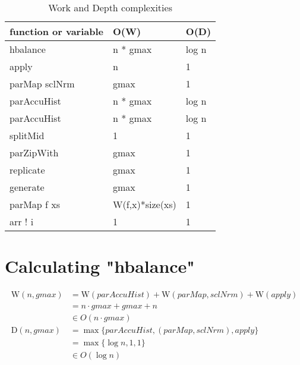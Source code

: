 \documentclass{article}
\newcommand{\W}[0]{\textrm{W}}
\newcommand{\D}[0]{\textrm{D}}
\begin{document}
      \paragraph{}
        \begin{table}[h]
          \caption{Work and Depth complexities}
          \label{timetable}
          \begin{tabular}{lll}
              \toprule
              function or variable & O(W)     & O(D) \\
              \midrule
              hbalance        & n * gmax      & log n \\
              apply           & n           & 1 \\
              parMap sclNrm   & gmax        & 1 \\
              parAccuHist     & n * gmax      & log n \\
              \midrule
              parAccuHist     & n * gmax      & log n \\
              splitMid        & 1           & 1 \\
              parZipWith      & gmax        & 1 \\
              replicate       & gmax        & 1 \\
              generate        & gmax        & 1 \\
              parMap f xs     & W(f,x)*size(xs) & 1 \\
              arr ! i          & 1           & 1 \\
          \end{tabular}
        \end{table}
        
    \section{Calculating "hbalance"}
      \begin{equation}
      \begin{split}
      \W(n,gmax)
            & = \W(parAccuHist) + \W(parMap,sclNrm) + \W(apply) \\
            & = n \cdot gmax + gmax + n \\
            & \in O(n \cdot gmax) \\
      \D(n,gmax)
          & = \max \{ parAccuHist, (parMap,sclNrm), apply\} \\
          & = \max \{ \log n, 1, 1\} \\
          & \in O(\log n) \\
      \end{split}
      \end{equation}
        
\end{document}
